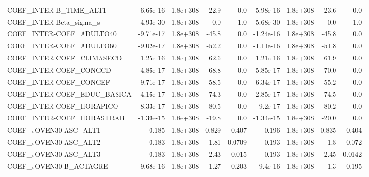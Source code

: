 \begin{tabular}{lrrrrrrrr}
COEF\_INTER-B\_TIME\_ALT1            &    6.66e-16 &     1.8e+308 &     -22.9 &      0.0 &   5.98e-16 &    1.8e+308 &        -23.6 &           0.0 \\
COEF\_INTER-Beta\_sigma\_s           &    4.93e-30 &     1.8e+308 &       0.0 &      1.0 &   5.68e-30 &    1.8e+308 &          0.0 &           1.0 \\
COEF\_INTER-COEF\_ADULTO40          &   -9.71e-17 &     1.8e+308 &     -45.8 &      0.0 &  -1.24e-16 &    1.8e+308 &        -45.8 &           0.0 \\
COEF\_INTER-COEF\_ADULTO60          &   -9.02e-17 &     1.8e+308 &     -52.2 &      0.0 &  -1.11e-16 &    1.8e+308 &        -51.8 &           0.0 \\
COEF\_INTER-COEF\_CLIMASECO         &   -1.25e-16 &     1.8e+308 &     -62.6 &      0.0 &  -1.21e-16 &    1.8e+308 &        -61.9 &           0.0 \\
COEF\_INTER-COEF\_CONGCD            &   -4.86e-17 &     1.8e+308 &     -68.8 &      0.0 &  -5.85e-17 &    1.8e+308 &        -70.0 &           0.0 \\
COEF\_INTER-COEF\_CONGEF            &   -9.71e-17 &     1.8e+308 &     -58.5 &      0.0 &  -6.34e-17 &    1.8e+308 &        -55.2 &           0.0 \\
COEF\_INTER-COEF\_EDUC\_BASICA       &   -4.16e-17 &     1.8e+308 &     -74.3 &      0.0 &  -2.85e-17 &    1.8e+308 &        -74.5 &           0.0 \\
COEF\_INTER-COEF\_HORAPICO          &   -8.33e-17 &     1.8e+308 &     -80.5 &      0.0 &   -9.2e-17 &    1.8e+308 &        -80.2 &           0.0 \\
COEF\_INTER-COEF\_HORASTRAB         &   -1.39e-15 &     1.8e+308 &     -19.8 &      0.0 &  -1.34e-15 &    1.8e+308 &        -20.0 &           0.0 \\
COEF\_JOVEN30-ASC\_ALT1             &       0.185 &     1.8e+308 &     0.829 &    0.407 &      0.196 &    1.8e+308 &        0.835 &         0.404 \\
COEF\_JOVEN30-ASC\_ALT2             &       0.183 &     1.8e+308 &      1.81 &   0.0709 &      0.193 &    1.8e+308 &          1.8 &         0.072 \\
COEF\_JOVEN30-ASC\_ALT3             &       0.183 &     1.8e+308 &      2.43 &    0.015 &      0.193 &    1.8e+308 &         2.45 &        0.0142 \\
COEF\_JOVEN30-B\_ACTAGRE            &    9.68e-16 &     1.8e+308 &     -1.27 &    0.203 &    9.4e-16 &    1.8e+308 &         -1.3 &         0.195 \\

\end{tabular}
